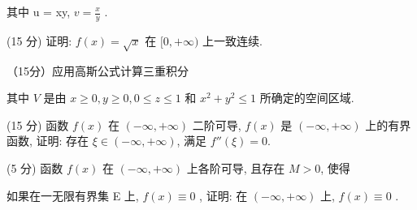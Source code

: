 其中 u = xy,  $v = \frac{x}{y}$ .\par
\par{}
(15 分) 证明: $f(x) = \sqrt{x}$ 在 $[0, +\infty)$ 上一致连续.\par
\par{}
\par{}
（15分）应用高斯公式计算三重积分\par
\nopagebreak[4]
其中 $V$ 是由 $x \geq 0, y \geq 0, 0 \leq z \leq 1$ 和 $x^2 + y^2 \leq 1$ 所确定的空间区域.\par
\par{}
(15 分) 函数 $f(x)$ 在 $(- \infty, + \infty)$ 二阶可导, $f(x)$ 是 $(- \infty, + \infty)$ 上的有界函数, 证明: 存在 $\xi \in (-\infty, + \infty)$, 满足 $f''(\xi) = 0$.\par
\par{}
\par{}
(5 分) 函数 $f(x)$ 在 $(- \infty, +\infty)$ 上各阶可导, 且存在 $M > 0$, 使得\par
\nopagebreak[4]
如果在一无限有界集 E 上,  $f(x) \equiv 0$ , 证明: 在  $(-∞, +∞)$  上,  $f(x) \equiv 0$ .\par
